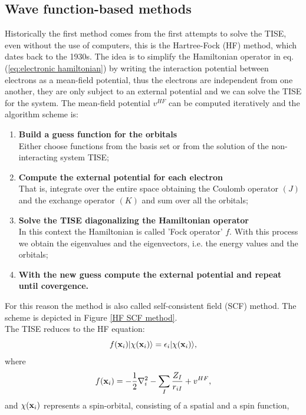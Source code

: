 \subsection{Wave function-based methods}
Historically the first method comes from the first attempts to solve the TISE, even without the use of computers, this is the Hartree-Fock (HF) method, which dates back to the 1930s. The idea is to simplify the Hamiltonian operator in eq. (\ref{eq:electronic hamiltonian}) by writing the interaction potential between electrons as a mean-field potential, thus the electrons are independent from one another, they are only subject to an external potential and we can solve the TISE for the system. The mean-field potential $v^{HF}$ can be computed iteratively and the algorithm scheme is:
\begin{enumerate}
    \item \textbf{Build a guess function for the orbitals} \\
    Either choose functions from the basis set or from the solution of the non-interacting system TISE;
    \item \textbf{Compute the external potential for each electron} \\
    That is, integrate over the entire space obtaining the Coulomb operator $(J)$
    and the exchange operator $(K)$ and sum over all the orbitals;
    \item \textbf{Solve the TISE diagonalizing the Hamiltonian operator} \\
    In this context the Hamiltonian is called 'Fock operator' $f$. With this process we obtain the eigenvalues and the eigenvectors, i.e. the energy values and the orbitals;
    \item \textbf{With the new guess compute the external potential and repeat until covergence.}
\end{enumerate}
For this reason the method is also called self-consistent field (SCF) method. The scheme is depicted in Figure \ref{HF SCF method}. \\
The TISE reduces to the HF equation:
\begin{equation}
    f({\bf x}_i) |\chi({\bf x}_i)\rangle = \epsilon_i |\chi({\bf x}_i)\rangle,
\end{equation}
where
\begin{equation}
    f({\bf x}_i) = -\frac12\nabla^2_i -\sum_I\frac{Z_I}{r_{iI}} + v^{HF},
\end{equation}
and $\chi({\bf x}_i)$ represents a spin-orbital, consisting of a spatial and a spin function,

